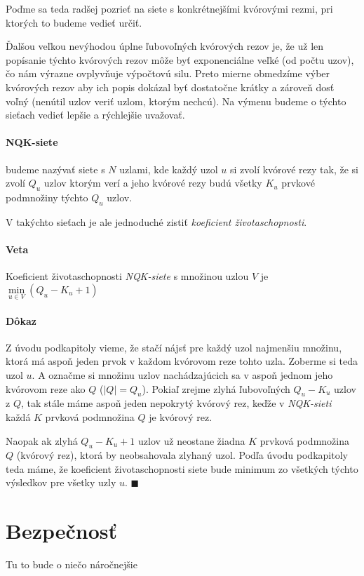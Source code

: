 Poďme sa teda radšej pozrieť na siete s konkrétnejšími kvórovými rezmi, pri ktorých
to budeme vedieť určiť.

Ďalšou veľkou nevýhodou úplne ľubovoľných kvórových rezov je,
že už len popísanie týchto kvórových rezov môže byť exponenciálne veľké (od počtu uzov),
čo nám výrazne ovplyvňuje výpočtovú silu. Preto mierne obmedzíme výber kvórových rezov
aby ich popis dokázal byť dostatočne krátky a zároveň dosť voľný (nenútil uzlov veriť
uzlom, ktorým nechcú). Na výmenu budeme o týchto sieťach vedieť lepšie a rýchlejšie
uvažovať.

\paragraph{NQK-siete} budeme nazývať siete s $N$ uzlami, kde každý uzol $u$ si
zvolí kvórové rezy tak, že si zvolí $Q_u$ uzlov ktorým verí a jeho kvórové rezy
budú všetky $K_u$ prvkové podmnožiny týchto $Q_u$ uzlov.

\vspace{4mm}
V takýchto sieťach je ale jednoduché zistiť \textit{koeficient životaschopnosti}.

\paragraph{Veta}
Koeficient životaschopnosti \textit{NQK-siete} s množinou uzlou $V$ je
$\min\limits_{u\in V}(Q_u-K_u+1)$

\paragraph{Dôkaz}Z úvodu podkapitoly vieme, že stačí nájsť pre každý uzol
najmenšiu množinu, ktorá má aspoň jeden prvok v každom kvórovom reze tohto uzla.
Zoberme si teda uzol $u$. A označme si množinu uzlov nachádzajúcich sa v aspoň
jednom jeho kvórovom reze ako $Q$ ($|Q|=Q_u$). Pokiaľ zrejme zlyhá ľubovoľných
$Q_u-K_u$ uzlov z $Q$, tak stále máme aspoň jeden nepokrytý kvórový rez, keďže v
\textit{NQK-sieti} každá $K$ prvková podmnožina $Q$ je kvórový rez.

Naopak ak zlyhá $Q_u-K_u+1$ uzlov už neostane žiadna $K$ prvková podmnožina $Q$
(kvórový rez), ktorá by neobsahovala zlyhaný uzol.
Podľa úvodu podkapitoly teda máme, že koeficient životaschopnosti siete bude
minimum zo všetkých týchto výsledkov pre všetky uzly $u$. $\blacksquare$


\section {Bezpečnosť}

Tu to bude o niečo náročnejšie
